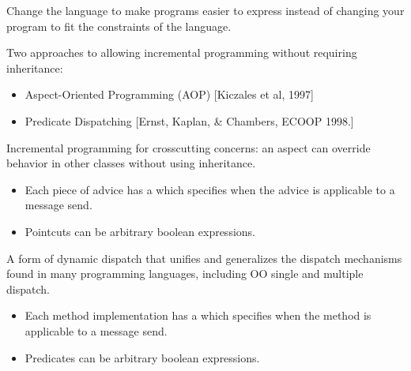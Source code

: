 \documentclass[landscape]{slides}
\begin{document}
\begin{slide}

  Change the language to make programs easier to express instead of
  changing your program to fit the constraints of the language.

  Two approaches to allowing incremental programming without requiring
  inheritance:
  \begin{itemize}
    \item Aspect-Oriented Programming (AOP) [Kiczales et al, 1997]
    \item Predicate Dispatching [Ernst, Kaplan, \& Chambers, ECOOP 1998.]
  \end{itemize}
\end{slide}

\begin{slide}

  Incremental programming for crosscutting concerns: an aspect can
  override behavior in other classes without using inheritance.

  \begin{itemize}
    \item Each piece of advice has a  which specifies
          when the advice is applicable to a message send.
    \item Pointcuts can be arbitrary boolean expressions.
  \end{itemize}
\end{slide}

\begin{slide}
  
  A form of dynamic dispatch that unifies and generalizes the dispatch
  mechanisms found in many programming languages, including OO single
  and multiple dispatch.

  \begin{itemize}
    \item Each method implementation has a  which
          specifies when the method is applicable to a message send.
    \item Predicates can be arbitrary boolean expressions.
  \end{itemize}
\end{slide}
\end{document}
